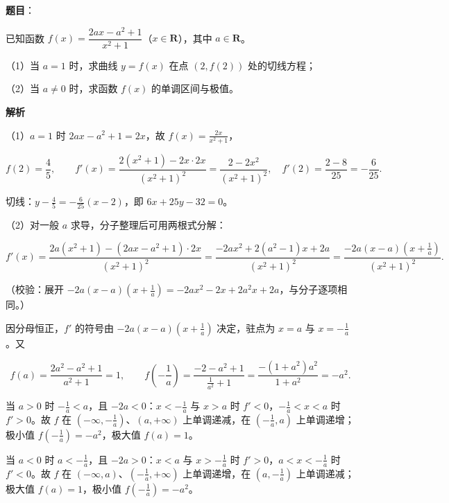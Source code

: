 \begin{answer}

\textbf{题目}：

已知函数 $f(x)=\dfrac{2ax-a^2+1}{x^2+1}$（$x\in\mathbf{R}$），其中 $a\in\mathbf{R}$。

（1）当 $a=1$ 时，求曲线 $y=f(x)$ 在点 $(2,f(2))$ 处的切线方程；

（2）当 $a\neq 0$ 时，求函数 $f(x)$ 的单调区间与极值。

\textbf{解析}

（1）$a=1$ 时 $2ax-a^2+1=2x$，故 $f(x)=\frac{2x}{x^2+1}$，

\nopagebreak[4]
\[f(2)=\frac45,\qquad f'(x)=\frac{2\left(x^2+1\right)-2x\cdot2x}{\left(x^2+1\right)^2}=\frac{2-2x^2}{\left(x^2+1\right)^2},\quad f'(2)=\frac{2-8}{25}=-\frac6{25}.\]

切线：$y-\frac45=-\frac6{25}(x-2)$，即 $6x+25y-32=0$。

（2）对一般 $a$ 求导，分子整理后可用两根式分解：

\nopagebreak[4]
\[f'(x)=\frac{2a\left(x^2+1\right)-\left(2ax-a^2+1\right)\cdot2x}{\left(x^2+1\right)^2}=\frac{-2ax^2+2\left(a^2-1\right)x+2a}{\left(x^2+1\right)^2}=\frac{-2a\left(x-a\right)\left(x+\frac1a\right)}{\left(x^2+1\right)^2}.\]

（校验：展开 $-2a\left(x-a\right)\left(x+\frac1a\right)=-2ax^2-2x+2a^2x+2a$，与分子逐项相同。）

因分母恒正，$f'$ 的符号由 $-2a\left(x-a\right)\left(x+\frac1a\right)$ 决定，驻点为 $x=a$ 与 $x=-\frac1a$。又

\nopagebreak[4]
\[f(a)=\frac{2a^2-a^2+1}{a^2+1}=1,\qquad f\left(-\frac1a\right)=\frac{-2-a^2+1}{\frac1{a^2}+1}=\frac{-\left(1+a^2\right)a^2}{1+a^2}=-a^2 .\]

当 $a>0$ 时 $-\frac1a<a$，且 $-2a<0$：$x<-\frac1a$ 与 $x>a$ 时 $f'<0$，$-\frac1a<x<a$ 时 $f'>0$。故 $f$ 在 $\left(-\infty,-\frac1a\right)$、$(a,+\infty)$ 上单调递减，在 $\left(-\frac1a,a\right)$ 上单调递增；极小值 $f\left(-\frac1a\right)=-a^2$，极大值 $f(a)=1$。

当 $a<0$ 时 $a<-\frac1a$，且 $-2a>0$：$x<a$ 与 $x>-\frac1a$ 时 $f'>0$，$a<x<-\frac1a$ 时 $f'<0$。故 $f$ 在 $(-\infty,a)$、$\left(-\frac1a,+\infty\right)$ 上单调递增，在 $\left(a,-\frac1a\right)$ 上单调递减；极大值 $f(a)=1$，极小值 $f\left(-\frac1a\right)=-a^2$。


\end{answer}
